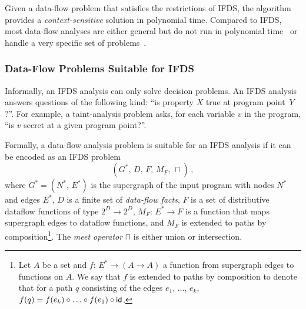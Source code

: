
Given a data-flow problem that satisfies the restrictions of IFDS, the algorithm provides a \textit{context-sensitive}  solution in polynomial time.
Compared to IFDS, most data-flow analyses are either general but do not run in polynomial time~\cite{knoop1992interprocedural,pnueli1981two} or handle a very specific set of problems~\cite{knoop1993efficient}.

\subsubsection{Data-Flow Problems Suitable for IFDS}\label{sec:suitableifds}

Informally, an IFDS analysis can only solve decision problems. An IFDS analysis answers questions of the following kind: ``is property $X$ true at program point~$Y$?''. For example, a taint-analysis problem asks, for each variable $v$ in the program, ``is $v$ secret at a given program point?''. 

Formally, a data-flow analysis problem is suitable for an IFDS analysis if it can be encoded as an IFDS problem
\begin{equation}
  (G^*,\,D,\,F,\,M_F,\,\sqcap)\,,
\end{equation} where $G^*=(N^*,\,E^*)$ is the supergraph of the input program with nodes $N^*$ and edges $E^*$, $D$ is a finite set of \textit{data-flow facts}, $F$ is a set of distributive dataflow functions of type $2^D\to2^D$, $M_F:\,E^*\to F$ is a function that maps supergraph edges to dataflow functions, and $M_F$ is extended to paths by composition\footnote{%
  Let $A$ be a set and $f:\,E^*\to(A\to A)$ a function from supergraph edges to functions on $A$.
  We say that $f$ is extended to  paths by composition to denote that for a path $q$ consisting of the edges $e_1,\,\dots,\,e_k$, $f(q)=f(e_k)\circ\ldots\circ f(e_1)\circ\textsf{id}$.
}. The \textit{meet operator} $\sqcap$ is either union or intersection.

